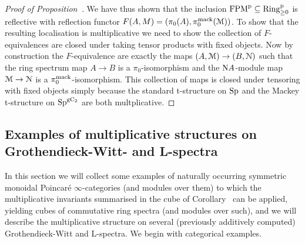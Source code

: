 \begin{proof}[Proof of Proposition~]
We have thus shown that the inclusion $\mathrm {FPM}^{\mathrm p} \subseteq \mathrm{Ring}^{\mathrm{p}}_{\geq 0}$ is reflective with reflection functor $F(A,M) = (\pi_0(A),\pi^{\mathrm{mack}}_0(\mathcal{M}))$. To show that the resulting localisation is multiplicative we need to show the collection of $F$-equivalences are closed under taking tensor products with fixed objects. Now by construction the $F$-equivalence are exactly the maps $(A,\mathcal{M}) \to (B,\mathcal{N})$ such that the ring spectrum map $A \to B$ is a $\pi_0$-isomorphism and the $\mathrm{N} A$-module map $\mathcal{M} \to \mathcal{N}$ is a $\pi_0^{\mathrm{mack}}$-isomorphism. This collection of maps is closed under tensoring with fixed objects simply because the standard t-structure on $\mathrm{Sp}$ and the Mackey t-structure on $\mathrm{Sp}^{\mathrm{g}\mathrm{C_2}}$ are both multplicative.
\end{proof}












\subsection{Examples of multiplicative structures on Grothendieck-Witt- and L-spectra}
\label{subsection:examples}%

In this section we will collect some examples of naturally occurring symmetric monoidal Poincaré $\infty$-categories (and modules over them) to which the multiplicative invariants summarised in the cube of Corollary~ can be applied, yielding cubes of commutative ring spectra (and modules over such), and we will describe the multiplicative structure on several (previously additively computed) Grothendieck-Witt and L-spectra. We begin with categorical examples.



